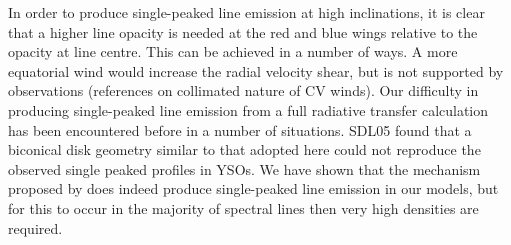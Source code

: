 \documentclass[preprint, a4paper, 11pt]{aastex}
\begin{document}
In order to produce single-peaked line emission at high inclinations,
it is clear that a higher line opacity is needed at the red and blue wings relative to
the opacity at line centre. This can be achieved in a number of ways. A more equatorial 
wind would increase the radial velocity shear, but is not supported by observations (references 
on collimated nature of CV winds).
Our difficulty in producing single-peaked line emission from a full 
radiative transfer calculation has been encountered before in a number of situations. 
SDL05 found that a biconical disk geometry similar to that adopted here could not reproduce 
the observed single peaked profiles in YSOs. We have shown
that the mechanism proposed by \cite{MC96} does indeed produce 
single-peaked line emission in our models, but for this to occur in the majority of
spectral lines then very high densities are required.   
\end{document}
